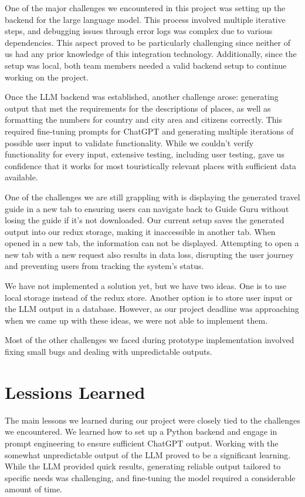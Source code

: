 \documentclass[english,notitlepage,smartquotes]{hgbreport}
\begin{document}
One of the major challenges we encountered in this project was setting up the backend for the large language model. This process involved multiple iterative steps, and debugging issues through error logs was complex due to various dependencies. This aspect proved to be particularly challenging since neither of us had any prior knowledge of this integration technology. Additionally, since the setup was local, both team members needed a valid backend setup to continue working on the project.

Once the LLM backend was established, another challenge arose: generating output that met the requirements for the descriptions of places, as well as formatting the numbers for country and city area and citizens correctly. This required fine-tuning prompts for ChatGPT and generating multiple iterations of possible user input to validate functionality. While we couldn't verify functionality for every input, extensive testing, including user testing, gave us confidence that it works for most touristically relevant places with sufficient data available.

One of the challenges we are still grappling with is displaying the generated travel guide in a new tab to ensuring users can navigate back to Guide Guru without losing the guide if it's not downloaded. Our current setup saves the generated output into our redux storage, making it inaccessible in another tab. When opened in a new tab, the information can not be displayed. Attempting to open a new tab with a new request also results in data loss, disrupting the user journey and preventing users from tracking the system's status.

We have not implemented a solution yet, but we have two ideas. One is to use local storage instead of the redux store. Another option is to store user input or the LLM output in a database. However, as our project deadline was approaching when we came up with these ideas, we were not able to implement them.

Most of the other challenges we faced during prototype implementation involved fixing small bugs and dealing with unpredictable outputs.

\section{Lessions Learned}

The main lessons we learned during our project were closely tied to the challenges we encountered. We learned how to set up a Python backend and engage in prompt engineering to ensure sufficient ChatGPT output. Working with the somewhat unpredictable output of the LLM proved to be a significant learning. While the LLM provided quick results, generating reliable output tailored to specific needs was challenging, and fine-tuning the model required a considerable amount of time.
\end{document}
